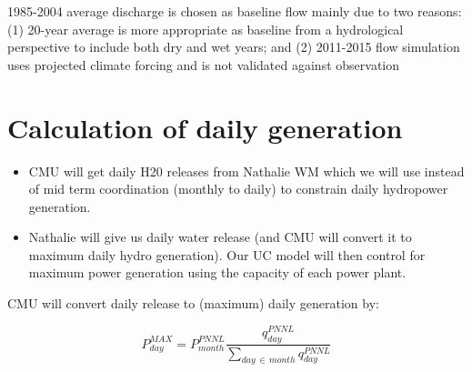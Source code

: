 \documentclass[11pt, oneside]{article}   	%
\begin{document}
1985-2004 average discharge is chosen as baseline flow mainly due to two reasons: (1) 20-year average is more appropriate as baseline from a hydrological perspective to include both dry and wet years; and (2) 2011-2015 flow simulation uses projected climate forcing and is not validated against observation

\section{Calculation of daily generation}

\begin{itemize}
\item CMU will get daily H20 releases from Nathalie WM which we will use instead of mid term coordination (monthly to daily) to constrain daily hydropower generation.
\item Nathalie will give us daily water release (and CMU will convert it to maximum daily hydro generation). Our UC model will then control for maximum power generation using the capacity of each power plant. 
\end{itemize}

CMU will convert daily release to (maximum) daily generation by:

$$P^{MAX}_{day} = P_{month}^{PNNL}\frac{q_{day}^{PNNL}}{\sum_{day \, \in\,  month} q_{day}^{PNNL}}$$
\end{document}
